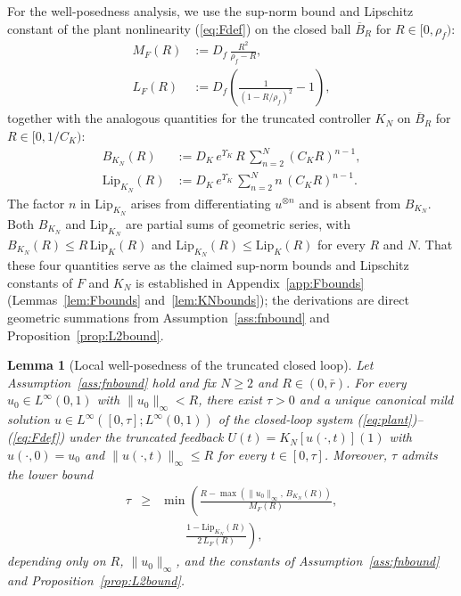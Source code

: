 \documentclass[amsthm]{autart}
\theoremstyle{plain}
\newtheorem{lemma}{Lemma}
\theoremstyle{definition}
\newcommand{\Linf}{L^\infty}
\newcommand{\Lipk}{\mathrm{Lip}_K}
\newcommand{\LipKn}{\mathrm{Lip}_{K_N}}
\begin{document}
For the well-posedness analysis, we use the sup-norm bound and Lipschitz constant of the plant nonlinearity (\ref{eq:Fdef}) on the closed ball $\overline B_R$ for $R \in [0, \rho_f)$:
\begin{align}
M_F(R) &:= D_f\,\frac{R^2}{\rho_f - R}, \label{eq:MFdef}\\
L_F(R) &:= D_f\!\left(\frac{1}{(1 - R/\rho_f)^2} - 1\right), \label{eq:LFdef}
\end{align}
together with the analogous quantities for the truncated controller $K_N$ on $\overline B_R$ for $R \in [0, 1/C_K)$:
\begin{align}
B_{K_N}(R) &:= D_K\, e^{\Upsilon_K}\, R\, \sum_{n=2}^N (C_K R)^{n-1}, \label{eq:BKNdef}\\
\LipKn(R) &:= D_K\, e^{\Upsilon_K}\, \sum_{n=2}^N n\,(C_K R)^{n-1}. \label{eq:LipKNdef}
\end{align}
The factor $n$ in $\LipKn$ arises from differentiating $u^{\otimes n}$ and is absent from $B_{K_N}$. Both $B_{K_N}$ and $\LipKn$ are partial sums of geometric series, with $B_{K_N}(R) \le R\, \Lipk(R)$ and $\LipKn(R) \le \Lipk(R)$ for every $R$ and $N$. That these four quantities serve as the claimed sup-norm bounds and Lipschitz constants of $F$ and $K_N$ is established in Appendix~\ref{app:Fbounds} (Lemmas~\ref{lem:Fbounds} and~\ref{lem:KNbounds}); the derivations are direct geometric summations from Assumption~\ref{ass:fnbound} and Proposition~\ref{prop:L2bound}.

\begin{lemma}[Local well-posedness of the truncated closed loop]\label{lem:wellposed}
Let Assumption~\ref{ass:fnbound} hold and fix $N \ge 2$ and $R \in (0, \bar r)$. For every $u_0 \in \Linf(0,1)$ with $\|u_0\|_\infty < R$, there exist $\tau > 0$ and a unique canonical mild solution $u \in \Linf([0, \tau]; \Linf(0,1))$ of the closed-loop system (\ref{eq:plant})--(\ref{eq:Fdef}) under the truncated feedback $U(t) = K_N[u(\cdot, t)](1)$ with $u(\cdot, 0) = u_0$ and $\|u(\cdot, t)\|_\infty \le R$ for every $t \in [0, \tau]$. Moreover, $\tau$ admits the lower bound
\begin{eqnarray}
\tau &\ge& \min\!\left(\frac{R - \max(\|u_0\|_\infty,\, B_{K_N}(R))}{M_F(R)},\right. \nonumber \\
&& \quad\quad \left.\frac{1 - \LipKn(R)}{2\, L_F(R)}\right),
\label{eq:tau_lb}
\end{eqnarray}
depending only on $R$, $\|u_0\|_\infty$, and the constants of Assumption~\ref{ass:fnbound} and Proposition~\ref{prop:L2bound}.
\end{lemma}
\end{document}
